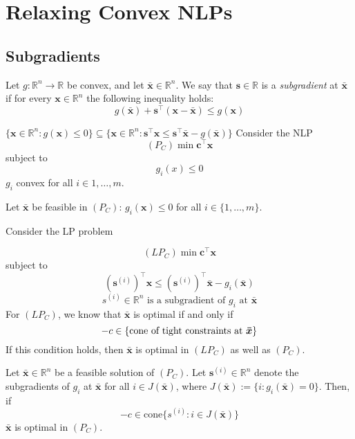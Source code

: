 \section{Relaxing Convex NLPs}
\subsection{Subgradients}
\begin{defbox}
    \begin{definition}
        Let $ g:\mathbb{R}^n\to\mathbb{R} $ be convex, and let $ \bm{\bar{x}}\in\mathbb{R}^n $.
        We say that $ \bm{s}\in\mathbb{R} $ is a \emph{subgradient} at $ \bm{\bar{x}} $
        if for every $ \bm{x}\in\mathbb{R}^n $ the following inequality holds:
        \[ g(\bm{\bar{x}})+\bm{s}^\top(\bm{x}-\bm{\bar{x}})\leqslant g(\bm{x}) \]
    \end{definition}
\end{defbox}
$ \{\bm{x}\in\mathbb{R}^n:g(\bm{x})\leqslant 0\}\subseteq
    \{\bm{x}\in\mathbb{R}^n:\bm{s}^\top\bm{x}\leqslant \bm{s}^\top \bm{\bar{x}}-g(\bm{\bar{x}})\}$
Consider the NLP
\[ (P_C)\min \bm{c}^\top\bm{x} \]
subject to
\[ g_i(x)\leqslant 0 \]
$ g_i $ convex for all $ i\in{1,\ldots ,m} $.

Let $ \bm{\bar{x}} $ be feasible in $ (P_C) $: $ g_i(\bm{x})\leqslant 0 $
for all $ i\in \{1,\ldots ,m\} $.

Consider the LP problem

\[ (LP_C)\min \bm{c}^\top\bm{x} \]
subject to
\[ (\bm{s}^{(i)})^\top \bm{x}\leqslant  (\bm{s}^{(i)})^\top \bm{\bar{x}}-g_i(\bm{\bar{x}}) \]
\[ s^{(i)}\in\mathbb{R}^n \text{ is a subgradient of $g_i$ at $\bm{\bar{x}}$} \]
For $ (LP_C) $, we know that $ \bm{\bar{x}} $ is optimal if and only if
\[ -c\in \{\text{cone of tight constraints at $ \bm{\bar{x}} $}\} \]
If this condition holds, then $ \bm{\bar{x}} $ is optimal in $ (LP_C) $ as
well as $ (P_C) $.

\begin{thmbox}
    \begin{theorem}
        Let $ \bm{\bar{x}}\in \mathbb{R}^n $ be a feasible solution of $ (P_C) $.
        Let $ \bm{s}^{(i)}\in\mathbb{R}^n $ denote the subgradients of $ g_i $
        at $ \bm{\bar{x}} $ for all $ i\in J(\bm{\bar{x}}) $, where
        $ J(\bm{\bar{x}}):=\{i:g_i(\bm{\bar{x}})=0\} $. Then, if
        \[ -c\in\text{cone} \{s^{(i)}:i\in J(\bm{\bar{x}})\} \]
        $ \bm{\bar{x}} $ is optimal in $ (P_C) $.
    \end{theorem}
\end{thmbox}

